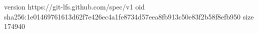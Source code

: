 version https://git-lfs.github.com/spec/v1
oid sha256:1e01469761613d62f7e426ec4a1fe8734d57eea8fb913c50e83f2b58f8efb950
size 174940
